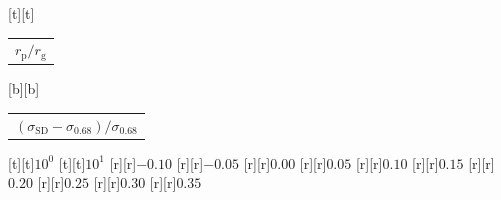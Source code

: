 %    
%
%
\begin{psfrags}%
\psfragscanon%
%
[t][t]{\color[rgb]{0,0,0}\setlength{\tabcolsep}{0pt}\begin{tabular}{c}{\Large$r_\mathrm{p}/r_\mathrm{g}$}\end{tabular}}%
[b][b]{\color[rgb]{0,0,0}\setlength{\tabcolsep}{0pt}\begin{tabular}{c}{\Large$(\sigma_\mathrm{SD}-\sigma_{0.68})/\sigma_{0.68}$}\end{tabular}}%
%
[t][t]{$10^{0}$}%
[t][t]{$10^{1}$}%
%
[r][r]{$-0.10$}%
[r][r]{$-0.05$}%
[r][r]{$0.00$}%
[r][r]{$0.05$}%
[r][r]{$0.10$}%
[r][r]{$0.15$}%
[r][r]{$0.20$}%
[r][r]{$0.25$}%
[r][r]{$0.30$}%
[r][r]{$0.35$}%
%
%
\end{psfrags}%
%
